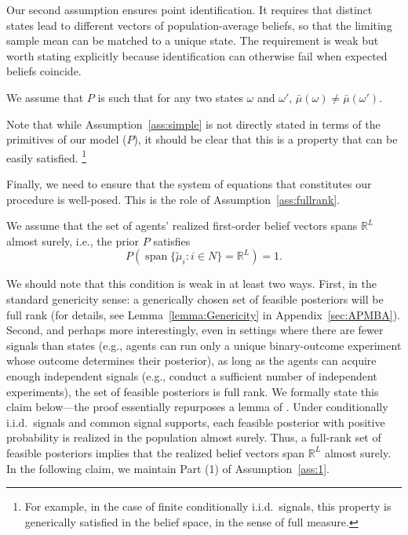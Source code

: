 \documentclass[12pt,reqno]{amsart}
\newcommand{\tmu}{\tilde{\mu}}
\begin{document}
Our second assumption ensures point identification. It requires that distinct states lead to different vectors of population-average beliefs, so that the limiting sample mean can be matched to a unique state. The requirement is weak but worth stating explicitly because identification can otherwise fail when expected beliefs coincide.

\begin{assumption}\label{ass:simple}
We assume that $P$ is such that for any two states $\omega$ and $\omega'$, $\bar{\mu}(\omega) \neq \bar{\mu}(\omega')$.
\end{assumption}
Note that while Assumption~\ref{ass:simple} is not directly stated in terms of the primitives of our model ($P$), it should be clear that this is a property that can be easily satisfied.%
\footnote{For example, in the case of finite conditionally i.i.d.\ signals, this property is generically satisfied in the belief space, in the sense of full measure.}
\par

Finally, we need to ensure that the system of equations that constitutes our procedure is well-posed. This is the role of Assumption~\ref{ass:fullrank}.
\begin{assumption}\label{ass:fullrank}
We assume that the set of agents' realized first-order belief vectors spans \(\mathbb{R}^L\) almost surely, i.e., the prior $P$ satisfies
\begin{equation*}
    P\left(\operatorname{span}\{\tmu_i:i\in N\}=\mathbb{R}^L\right)=1.
\end{equation*}

\end{assumption}

We should note that this condition is weak in at least two ways. First, in the standard genericity sense: a generically chosen set of feasible posteriors will be full rank (for details, see Lemma~\ref{lemma:Genericity} in Appendix~\ref{sec:APMBA}). Second, and perhaps more interestingly, even in settings where there are fewer signals than states (e.g., agents can run only a unique binary-outcome experiment whose outcome determines their posterior), as long as the agents can acquire enough independent signals (e.g., conduct a sufficient number of independent experiments), the set of feasible posteriors is full rank. We formally state this claim below---the proof essentially repurposes a lemma of \cite{fu2021full}. Under conditionally i.i.d.\ signals and common signal supports, each feasible posterior with positive probability is realized in the population almost surely. Thus, a full-rank set of feasible posteriors implies that the realized belief vectors span $\mathbb{R}^L$ almost surely. In the following claim, we maintain Part (1) of Assumption~\ref{ass:1}.
\end{document}

